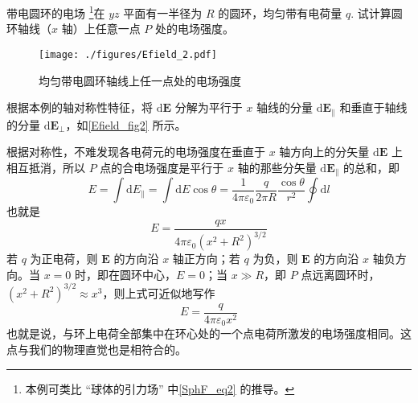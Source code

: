 \begin{example}{带电圆环的电场}\label{Efield_ex2}
\footnote{本例可类比 “球体的引力场” 中\autoref{SphF_eq2} 的推导。}在 $yz$ 平面有一半径为 $R$ 的圆环，均匀带有电荷量 $q$. 试计算圆环轴线（$x$ 轴）上任意一点 $P$ 处的电场强度。
\begin{figure}[ht]
\centering
\texttt{[image: ./figures/Efield\_2.pdf]}
\caption{均匀带电圆环轴线上任一点处的电场强度} \label{Efield_fig2}
\end{figure}

根据本例的轴对称性特征，将 $\mathrm d\mathbf E$ 分解为平行于 $x$ 轴线的分量 $\mathrm d\mathbf E_\parallel$ 和垂直于轴线的分量 $\mathrm d\mathbf E_\perp$，如\autoref{Efield_fig2} 所示。

根据对称性，不难发现各电荷元的电场强度在垂直于 $x$ 轴方向上的分矢量 $\mathrm d\mathbf E$ 上相互抵消，所以 $P$ 点的合电场强度是平行于 $x$ 轴的那些分矢量 $\mathrm d\mathbf E_\parallel$ 的总和，即
\begin{equation}
E=\int \mathrm{d} E_\parallel=\int \mathrm{d} E \cos \theta=\frac{1}{4 \pi \varepsilon_{0}} \frac{q}{2 \pi R} \frac{\cos \theta}{r^{2}} \oint \mathrm{d} l
\end{equation}
也就是
\begin{equation} \label{Efield_eq6}
E=\frac{q x}{4 \pi \varepsilon_{0}\left(x^{2}+R^{2}\right)^{3 / 2}} 
\end{equation}
若 $q$ 为正电荷，则 $\mathbf E$ 的方向沿 $x$ 轴正方向；若 $q$ 为负，则 $\mathbf E$ 的方向沿 $x$ 轴负方向。当 $x=0$ 时，即在圆环中心，$E=0$；当 $x\gg R$，即 $P$ 点远离圆环时，$\left(x^{2}+R^{2}\right)^{3 / 2} \approx x^{3}$，则上式可近似地写作
\begin{equation}
E=\frac{q}{4 \pi \varepsilon_{0} x^{2}}
\end{equation}
也就是说，与环上电荷全部集中在环心处的一个点电荷所激发的电场强度相同。这点与我们的物理直觉也是相符合的。
\end{example}


